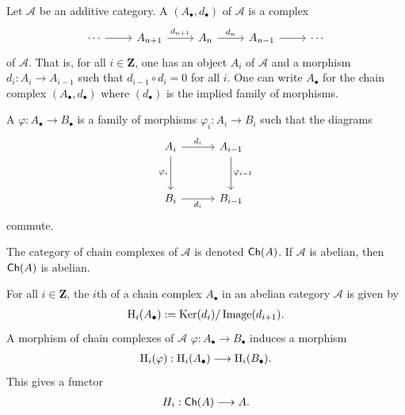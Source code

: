 \documentclass [11 pt, oneside] {article}
\begin{document}
\begin{definition}[ ]\label{}\text{}
Let $\mathscr{A}$ be an additive category. A  $(A_\bullet, d_\bullet)$ of $\mathscr{A}$ is a complex
\[
\begin{tikzcd}
	\cdots \ar[r] & A_{n+1} \ar[r,"d_{n+1}"] & A_n \ar[r,"d_n"] & A_{n-1}\ar[r] &\cdots
\end{tikzcd}
\]
of $\mathscr{A}$. That is, for all $i\in \mathbf{Z}$, one has an object $A_i$ of $\mathscr{A}$ and a morphism $d_i : A_i\longrightarrow A_{i-1}$ such that $d_{i-1}\circ d_i = 0$ for all $i$. One can write $A_\bullet$ for the chain complex $(A_\bullet, d_\bullet) $ where $(d_\bullet)$ is the implied family of morphisms. 

A  $\varphi : A_\bullet \longrightarrow B_\bullet$ is a family of morphisms $\varphi_i :A_i\longrightarrow B_i$ such that the diagrams
\[
\begin{tikzcd}[row sep = 3 em, column sep = 3 em]
	A_i \ar[r,"d_i"] \ar[d, "\varphi_i", swap] &A_{i-1}\ar[d,"\varphi_{i-1}"] \\B_i\ar[r,"d_i", swap] & B_{i-1}
\end{tikzcd}
\]
commute.

The category of chain complexes of $\mathscr{A}$ is denoted $\textsf{Ch}(\relax{A})$. If $\mathscr{A}$ is abelian, then $\textsf{Ch}(\relax{A})$ is abelian.

\end{definition}

\begin{definition}[ ]\label{}\text{}
For all $i\in \mathbf{Z}$, the $i$th  of a chain complex $A_\bullet$ in an abelian category $\mathscr{A}$ is given by
\begin{align*}
	\operatorname{H}_i(A_\bullet) := \operatorname{Ker}  (d_i)/\operatorname{Image} (d_{i+1}).
\end{align*}
A morphism of chain complexes of $\mathscr{A}$ $\varphi: A_\bullet\longrightarrow B_\bullet$ induces a morphism 
\begin{align*}
	\operatorname{H}_i(\varphi): \operatorname{H}_i (A_\bullet) \longrightarrow\operatorname{H}_i(B_\bullet). 
\end{align*}
This gives a functor
\begin{align*}
	H_i : \textsf{Ch}(\relax{A}) \longrightarrow \relax{A}.
\end{align*}
\end{definition}
\end{document}
